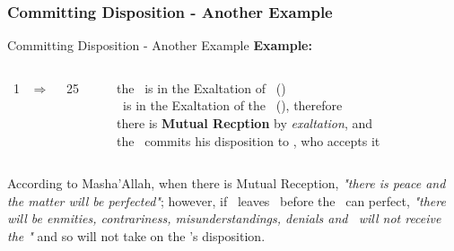 \subsubsection{Committing Disposition - Another Example}
\begin{frame}[t]{Committing Disposition - Another Example}
\textbf{Example:}\footnotemark[1]
\begin{columns}[T, onlytextwidth]
\Sun\ 1 \Libra\ $\Rightarrow$ \Opposition\ \Saturn\ 25 \Aries

\rule{.1mm}{.20\textheight}

the \Sun\ is in the Exaltation of \Saturn\ (\Libra) \\
\Saturn\ is in the Exaltation of the \Sun\ (\Aries), therefore \\
there is \textbf{Mutual Recption} by \textsl{exaltation}, and \\
the \Sun\ commits his disposition to \Saturn, who accepts it
\end{columns}
\vspace{0.5cm}
According to Masha'Allah, when there is Mutual Reception, \textsl{"there is peace and the matter will be perfected"}; however, if \Saturn\ leaves \Aries\ before the \Opposition\ can perfect, \textsl{"there will be enmities, contrariness, misunderstandings, denials and \Saturn\ will not receive the \Sun"} and so will not take on the \Sun's disposition.

\end{frame}
